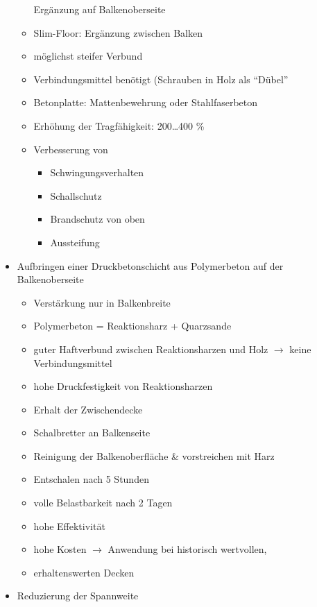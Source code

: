\documentclass[fleqn,twoside,dvipsnames]{article}
\begin{document}
\begin{itemize}
\begin{itemize}
                        Ergänzung auf Balkenoberseite
                    \item Slim-Floor:
                        Ergänzung zwischen Balken
                    \item möglichst steifer Verbund
                    \item Verbindungsmittel benötigt (Schrauben in Holz als \enquote{Dübel}
                    \item Betonplatte: Mattenbewehrung oder Stahlfaserbeton
                    \item Erhöhung der Tragfähigkeit: 200…400 \%
                    \item Verbesserung von
                        \begin{itemize}
                            \item Schwingungsverhalten
                            \item Schallschutz
                            \item Brandschutz von oben
                            \item Aussteifung
                        \end{itemize}
                \end{itemize}
            \item Aufbringen einer Druckbetonschicht aus Polymerbeton auf der Balkenoberseite
                \begin{itemize}
                    \item Verstärkung nur in Balkenbreite
                    \item Polymerbeton = Reaktionsharz + Quarzsande
                    \item guter Haftverbund zwischen Reaktionsharzen und Holz $\rightarrow$ keine Verbindungsmittel
                    \item hohe Druckfestigkeit von Reaktionsharzen
                    \item Erhalt der Zwischendecke
                    \item Schalbretter an Balkenseite
                    \item Reinigung der Balkenoberfläche \& vorstreichen mit Harz
                    \item Entschalen nach 5 Stunden
                    \item volle Belastbarkeit nach 2 Tagen
                    \item hohe Effektivität
                    \item hohe Kosten $\rightarrow$ Anwendung bei historisch wertvollen,
                    \item erhaltenswerten Decken
                \end{itemize}
            \item Reduzierung der Spannweite  
        \end{itemize}
\end{document}
